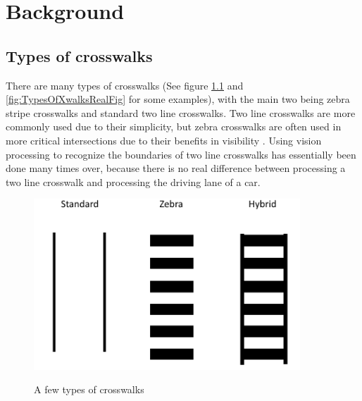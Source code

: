\documentclass[12pt]{ucthesis}
\newcommand{\captionfonts}{\small\bf\ssp}
\begin{document}


\chapter{Background}
\section{Types of crosswalks}

There are many types of crosswalks (See figure \ref{fig:TypesOfXwalksFig} and \ref{fig:TypesOfXwalksRealFig} for some examples), with the main two being zebra stripe crosswalks and standard two line crosswalks. Two line crosswalks are more commonly used due to their simplicity, but zebra crosswalks are often used in more critical intersections due to their benefits in visibility \cite{crosswalkTypeEvaluation}. Using vision processing to recognize the boundaries of two line crosswalks has essentially been done many times over, because there is no real difference between processing a two line crosswalk and processing the driving lane of a car.

\begin{figure}[h]
\begin{center}
\includegraphics[width=10cm]{TypesOfXwalks.png}
\captionfonts
\caption[This is a figure]{A few types of crosswalks}
\label{fig:TypesOfXwalksFig}
\end{center}
\end{figure}
\end{document}
